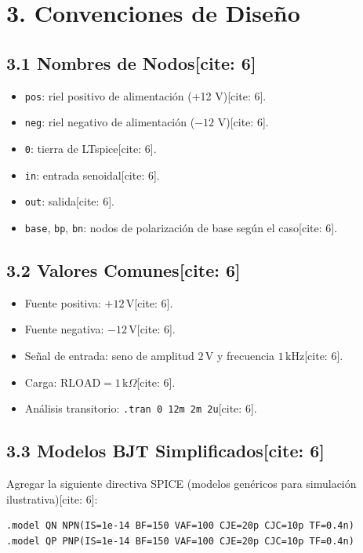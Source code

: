 \documentclass[11pt, a4paper]{article}
\begin{document}
\section*{3. Convenciones de Diseño}
\subsection*{3.1 Nombres de Nodos[cite: 6]}
\begin{itemize}
    \item \texttt{pos}: riel positivo de alimentación (+12 V)[cite: 6].
    \item \texttt{neg}: riel negativo de alimentación ($-12$ V)[cite: 6].
    \item \texttt{0}: tierra de LTspice[cite: 6].
    \item \texttt{in}: entrada senoidal[cite: 6].
    \item \texttt{out}: salida[cite: 6].
    \item \texttt{base}, \texttt{bp}, \texttt{bn}: nodos de polarización de base según el caso[cite: 6].
\end{itemize}

\subsection*{3.2 Valores Comunes[cite: 6]}
\begin{itemize}
    \item Fuente positiva: $+12\,\text{V}$[cite: 6].
    \item Fuente negativa: $-12\,\text{V}$[cite: 6].
    \item Señal de entrada: seno de amplitud $2\,\text{V}$ y frecuencia $1\,\text{kHz}$[cite: 6].
    \item Carga: $\text{RLOAD} = 1\,\text{k}\Omega$[cite: 6].
    \item Análisis transitorio: \texttt{.tran 0 12m 2m 2u}[cite: 6].
\end{itemize}

\subsection*{3.3 Modelos BJT Simplificados[cite: 6]}
Agregar la siguiente directiva SPICE (modelos genéricos para simulación ilustrativa)[cite: 6]:
\begin{lstlisting}[style=spice]
.model QN NPN(IS=1e-14 BF=150 VAF=100 CJE=20p CJC=10p TF=0.4n)
.model QP PNP(IS=1e-14 BF=150 VAF=100 CJE=20p CJC=10p TF=0.4n)
\end{lstlisting}
\end{document}
